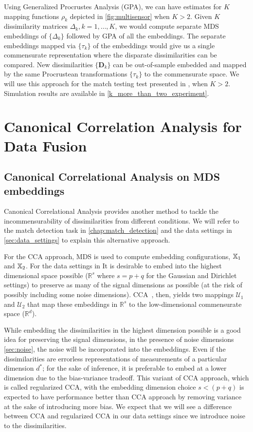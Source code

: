 \documentclass[12pt,oneside,final]{thesis}\usepackage[]{graphicx}\usepackage[]{color}
\begin{document}
Using Generalized Procrustes Analysis (GPA), we can have estimates for $K$ mapping functions $\rho_k$ depicted in \ref{fig:multisensor} when $K>2$. Given $K$  dissimilarity matrices $\Delta_k,k=1,\ldots,K$,  we would compute separate  MDS embeddings of  $\{\Delta_k \}$  followed by GPA of all the embeddings. The separate embeddings mapped via $\{\tau_k \}$ of the embeddings would give us a single commensurate representation where the disparate dissimilarities can be compared. New dissimilarities $\{ \bm{D}_k \}$ can be out-of-sample embedded  and mapped by the same Procrustean transformations  $\{\tau_k \}$ to the commensurate space. We will use this approach  for the match testing test presented in \label{sec:match detection}, when $K>2$. Simulation results are available in \ref{k_more_than_two_experiment}.






\chapter{Canonical Correlation Analysis for Data Fusion}
\label{chap:CCA}

\section{Canonical Correlational Analysis on MDS embeddings\label{sec:CCA}}

Canonical Correlational Analysis provides another method to tackle the incommensurability of dissimilarities from different conditions. We will refer to the match detection task in \autoref{chap:match_detection} and the data settings in \autoref{sec:data_settings} to explain this alternative approach.

For the CCA approach, MDS is used  to compute embedding configurations, $ \mathbb{X}_1$ and $\mathbb{X}_2$. For the data settings in  It is desirable to  embed into the highest dimensional space  possible ($\mathbb{R}^{s}$ where $s=p+q$ for the Gaussian and Dirichlet settings)  to  preserve as many of the signal dimensions as possible (at the risk of possibly including  some noise dimensions). CCA~\cite{Hardoon2004}, then,  yields two mappings $\mathcal{U}_1$ and $\mathcal{U}_2$ that map these embeddings in $\mathbb{R}^{s}$ to  the low-dimensional commensurate space ($\mathbb{R}^d$). 

While embedding the dissimilarities in the  highest dimension possible is a good idea for preserving the signal dimensions, in the presence of noise dimensions \ref{sec:noise}, the noise will be incorporated into the embeddings. Even if the dissimilarities are errorless representations of measurements of a particular dimension $d^*$; for  the  sake of inference, it is preferable to embed at a lower  dimension due to the bias-variance tradeoff. This variant of CCA approach, which is called regularized CCA, with the  embedding dimension choice $s< (p+q)$ is expected to have performance better than CCA approach by removing variance at the sake of introducing more bias. We expect that  we will see a difference between CCA and regularized CCA  in our data settings since we introduce noise to the dissimilarities.
\end{document}
